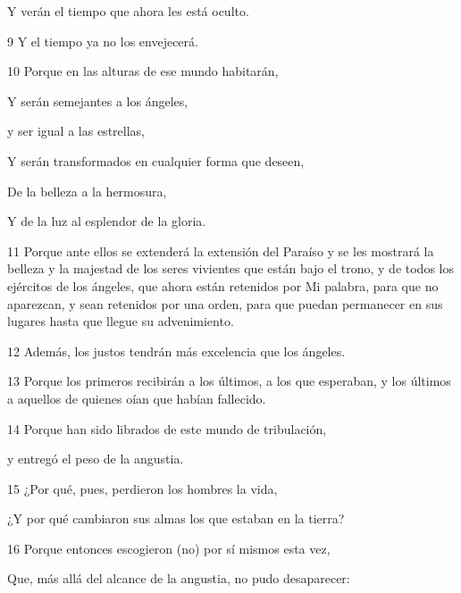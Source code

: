 \par Y verán el tiempo que ahora les está oculto.

\par 9 Y el tiempo ya no los envejecerá.

\par 10 Porque en las alturas de ese mundo habitarán,

\par Y serán semejantes a los ángeles,

\par y ser igual a las estrellas,

\par Y serán transformados en cualquier forma que deseen,

\par De la belleza a la hermosura,

\par Y de la luz al esplendor de la gloria.

\par 11 Porque ante ellos se extenderá la extensión del Paraíso y se les mostrará la belleza y la majestad de los seres vivientes que están bajo el trono, y de todos los ejércitos de los ángeles, que ahora están retenidos por Mi palabra, para que no aparezcan, y sean retenidos por una orden, para que puedan permanecer en sus lugares hasta que llegue su advenimiento.

\par 12 Además, los justos tendrán más excelencia que los ángeles.

\par 13 Porque los primeros recibirán a los últimos, a los que esperaban, y los últimos a aquellos de quienes oían que habían fallecido.

\par 14 Porque han sido librados de este mundo de tribulación,

\par y entregó el peso de la angustia.

\par 15 ¿Por qué, pues, perdieron los hombres la vida,

\par ¿Y por qué cambiaron sus almas los que estaban en la tierra?

\par 16 Porque entonces escogieron (no) por sí mismos esta vez,

\par Que, más allá del alcance de la angustia, no pudo desaparecer:

